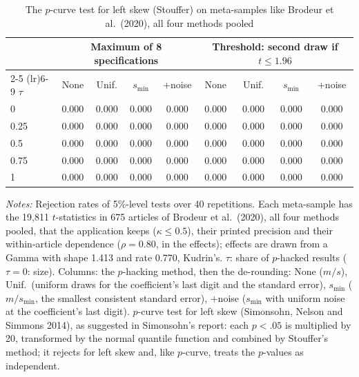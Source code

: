 \begin{table}[htbp]
\centering
\caption{The $p$-curve test for left skew (Stouffer) on meta-samples like Brodeur et al.\ (2020), all four methods pooled}
\label{tab:brodeur_all_power_stouffer}
\footnotesize
\setlength{\tabcolsep}{4pt}
\begin{tabular}{lcccccccc}
\toprule
 & \multicolumn{4}{c}{Maximum of 8 specifications} & \multicolumn{4}{c}{Threshold: second draw if $t \le 1.96$} \\
\cmidrule(lr){2-5} \cmidrule(lr){6-9}
$\tau$ & None & Unif. & $s_{\min}$ & $+$noise & None & Unif. & $s_{\min}$ & $+$noise \\
\midrule
0 & 0.000 & 0.000 & 0.000 & 0.000 & 0.000 & 0.000 & 0.000 & 0.000 \\
0.25 & 0.000 & 0.000 & 0.000 & 0.000 & 0.000 & 0.000 & 0.000 & 0.000 \\
0.5 & 0.000 & 0.000 & 0.000 & 0.000 & 0.000 & 0.000 & 0.000 & 0.000 \\
0.75 & 0.000 & 0.000 & 0.000 & 0.000 & 0.000 & 0.000 & 0.000 & 0.000 \\
1 & 0.000 & 0.000 & 0.000 & 0.000 & 0.000 & 0.000 & 0.000 & 0.000 \\
\bottomrule
\end{tabular}
\par\smallskip
\begin{minipage}{\linewidth}\footnotesize\textit{Notes:} Rejection rates of 5\%-level tests over 40 repetitions. Each meta-sample has the 19{,}811 $t$-statistics in 675 articles of Brodeur et al.\ (2020), all four methods pooled, that the application keeps ($\kappa \le 0.5$), their printed precision and their within-article dependence ($\rho = 0.80$, in the effects); effects are drawn from a Gamma with shape 1.413 and rate 0.770, Kudrin's. $\tau$: share of $p$-hacked results ($\tau = 0$: size). Columns: the $p$-hacking method, then the de-rounding: None ($m/s$), Unif.\ (uniform draws for the coefficient's last digit and the standard error), $s_{\min}$ ($m/s_{\min}$, the smallest consistent standard error), $+$noise ($s_{\min}$ with uniform noise at the coefficient's last digit). $p$-curve test for left skew (Simonsohn, Nelson and Simmons 2014), as suggested in Simonsohn's report: each $p < .05$ is multiplied by 20, transformed by the normal quantile function and combined by Stouffer's method; it rejects for left skew and, like $p$-curve, treats the $p$-values as independent.\end{minipage}
\end{table}
